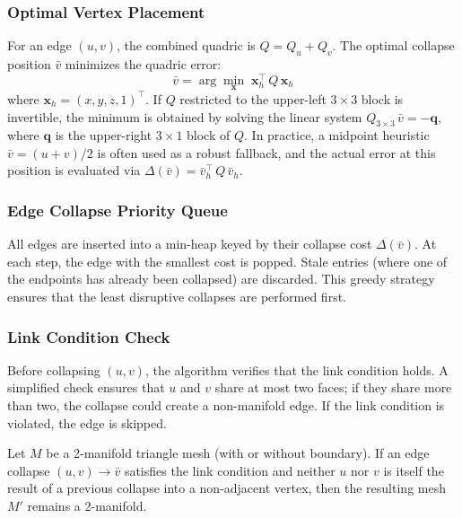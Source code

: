 \subsubsection{Optimal Vertex Placement}

For an edge $(u, v)$, the combined quadric is $Q = Q_u + Q_v$. The optimal collapse position $\bar{v}$ minimizes the quadric error:
\[
    \bar{v} = \arg\min_{\mathbf{x}} \; \mathbf{x}_h^\top \, Q \, \mathbf{x}_h
\]
where $\mathbf{x}_h = (x, y, z, 1)^\top$. If $Q$ restricted to the upper-left $3 \times 3$ block is invertible, the minimum is obtained by solving the linear system $Q_{3\times3} \, \bar{v} = -\mathbf{q}$, where $\mathbf{q}$ is the upper-right $3 \times 1$ block of $Q$. In practice, a midpoint heuristic $\bar{v} = (u + v)/2$ is often used as a robust fallback, and the actual error at this position is evaluated via $\Delta(\bar{v}) = \bar{v}_h^\top \, Q \, \bar{v}_h$.

\subsubsection{Edge Collapse Priority Queue}

All edges are inserted into a min-heap keyed by their collapse cost $\Delta(\bar{v})$. At each step, the edge with the smallest cost is popped. Stale entries (where one of the endpoints has already been collapsed) are discarded. This greedy strategy ensures that the least disruptive collapses are performed first.

\subsubsection{Link Condition Check}

Before collapsing $(u, v)$, the algorithm verifies that the link condition holds. A simplified check ensures that $u$ and $v$ share at most two faces; if they share more than two, the collapse could create a non-manifold edge. If the link condition is violated, the edge is skipped.

\begin{theorem}\label{thm:manifold_preservation}
Let $M$ be a 2-manifold triangle mesh (with or without boundary). If an edge collapse $(u, v) \to \bar{v}$ satisfies the link condition and neither $u$ nor $v$ is itself the result of a previous collapse into a non-adjacent vertex, then the resulting mesh $M'$ remains a 2-manifold.
\end{theorem}

